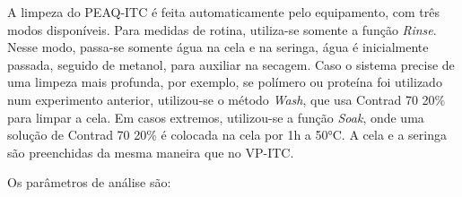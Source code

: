 		A limpeza do PEAQ-ITC é feita automaticamente pelo equipamento, com três modos disponíveis. Para medidas de rotina, utiliza-se somente a função \emph{Rinse}. Nesse modo, passa-se somente água na cela e na seringa, água é inicialmente passada, seguido de metanol, para auxiliar na secagem. Caso o sistema precise de uma limpeza mais profunda, por exemplo, se polímero ou proteína foi utilizado num experimento anterior, utilizou-se o método \emph{Wash}, que usa Contrad 70 20\% para limpar a cela. Em casos extremos, utilizou-se a função \emph{Soak}, onde uma solução de Contrad 70 20\% é colocada na cela por 1h a 50°C. A cela e a seringa são preenchidas da mesma maneira que no VP-ITC.
		
		Os parâmetros de análise são: %
		
